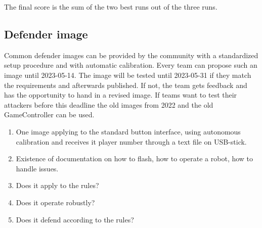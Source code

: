 The final score is the sum of the two best runs out of the three runs.

\subsection{Defender image}
\label{sec:Challenge_image}
Common defender images can be provided by the community with a standardized setup procedure and with automatic calibration. Every team can propose such an image until 2023-05-14. The image will be tested until 2023-05-31 if they match the requirements and afterwards published. If not, the team gets feedback and has the opportunity to hand in a revised image. If teams want to test their attackers before this deadline the old images from 2022 and the old GameController can be used.

\begin{enumerate}
	\item One image applying to the standard button interface, using autonomous calibration and receives it player number through a text file on USB-stick.
	\item Existence of documentation on how to flash, how to operate a robot, how to handle issues.
	\item Does it apply to the rules?
	\item Does it operate robustly?
	\item Does it defend according to the rules?
\end{enumerate}
